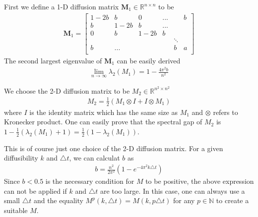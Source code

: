 

First we define a 1-D diffusion matrix
$\mathbf{M}_{1}\in\mathbb{R}^{n\times n}$ to be
\begin{eqnarray*}
  \mathbf{M}_{1} =  \left[
             \begin{matrix}
               1-2b & b & 0   & ...  &    &  b \\
               b & 1-2b & b   & ...  &    &    \\
               0 & b & 1-2b   & b    &    &    \\
                 &   &     &      & \ddots & \\
               b & ... &     &    & b  &  a \\
             \end{matrix}
           \right]
\end{eqnarray*}
 The second largest eigenvalue
of $\mathbf{M}_{1}$ can be easily derived
\begin{eqnarray*}
 \lim_{n\to\infty}\lambda_{2}(M_1) = 1-\frac{4\pi^{2}b}{n^2}
\end{eqnarray*}

We choose the 2-D diffusion matrix to be
$M_{2}\in\mathbb{R}^{n^{2}\times n^{2}}$
\begin{eqnarray*}
 M_{2} = \frac{1}{2}\left( M_{1}\otimes I+ I\otimes M_{1} \right)
\end{eqnarray*}
where $I$ is the identity matrix which has the same size as $M_{1}$
and $\otimes$ refers to Kronecker product. One can easily prove that
the spectral gap of $M_2$ is $1- \frac{1}{2}(\lambda_{2}(M_1)+1) =
\frac{1}{2}(1-\lambda_{2}(M_1))$.

This is of course just one choice of the 2-D diffusion matrix. For a
given diffusibility $k$ and $\triangle t$, we can calculat $b$ as
\begin{eqnarray*}
b = \frac{n^2}{2\pi^2}(1-e^{-4\pi^2 k \triangle t})
\end{eqnarray*}
Since $b < 0.5$ is the necessary condition for $M$ to be positive, the above expression can not be applied if $k$ and $\triangle t$ are too large. In this case, one can always use a small $\triangle t$ and the equality $M^p(k,\triangle t) = M(k,p \triangle t)$ for any $p \in \mathbb{N}$ to create a suitable $M$.



